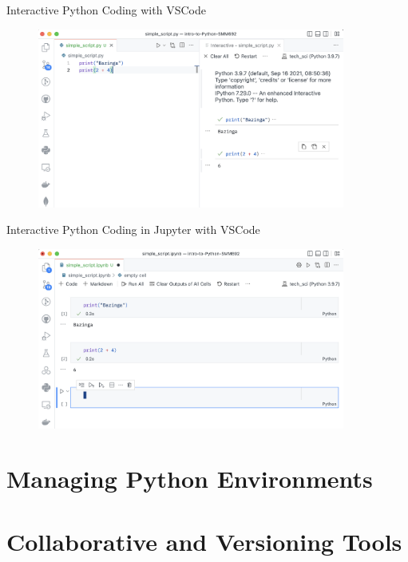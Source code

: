 \documentclass[aspectratio=1610]{beamer}
\begin{document}
\begin{frame}{Interactive Python Coding with VSCode}
		\begin{figure}
			\includegraphics[width=0.9\textwidth]{images/vscode}
		\end{figure}
\end{frame}

\begin{frame}{Interactive Python Coding in Jupyter with VSCode}
		\begin{figure}
			\includegraphics[width=0.9\textwidth]{images/jupyter_in_vscode}
		\end{figure}
\end{frame}

\section{Managing Python Environments}


\section{Collaborative and Versioning Tools}
\end{document}
